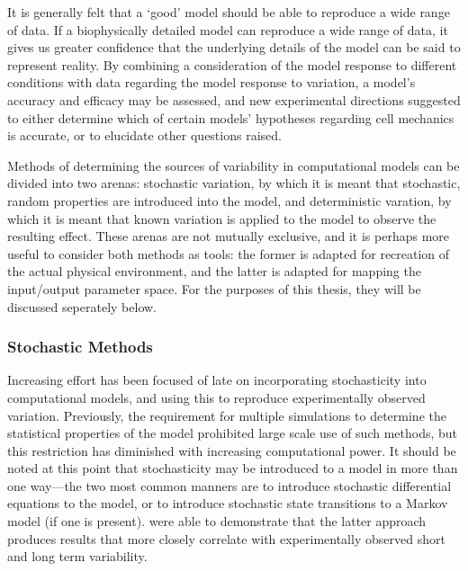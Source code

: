 \documentclass[../thesis-main.tex]{subfiles}
\begin{document}
It is generally felt that a `good' model should be able to reproduce a wide range of data. If a biophysically detailed model can reproduce a wide range of data, it gives us greater confidence that the underlying details of the model can be said to represent reality. By combining a consideration of the model response to different conditions with data regarding the model response to variation, a model's accuracy and efficacy may be assessed, and new experimental directions suggested to either determine which of certain models' hypotheses regarding cell mechanics is accurate, or to elucidate other questions raised.

Methods of determining the sources of variability in computational models can be divided into two arenas: stochastic variation, by which it is meant that stochastic, random properties are introduced into the model, and deterministic varation, by which it is meant that known variation is applied to the model to observe the resulting effect. These arenas are not mutually exclusive, and it is perhaps more useful to consider both methods as tools: the former is adapted for recreation of the actual physical environment, and the latter is adapted for mapping the input/output parameter space. For the purposes of this thesis, they will be discussed seperately below.

\subsubsection{Stochastic Methods}
\label{subsubsec:stochastic}
Increasing effort has been focused of late on incorporating stochasticity into computational models, and using this to reproduce experimentally observed variation. Previously, the requirement for multiple simulations to determine the statistical properties of the model prohibited large scale use of such methods, but this restriction has diminished with increasing computational power. It should be noted at this point that stochasticity may be introduced to a model in more than one way---the two most common manners are to introduce stochastic differential equations to the model, or to introduce stochastic state transitions to a Markov model (if one is present). \citet{Heijman2013} were able to demonstrate that the latter approach produces results that more closely correlate with experimentally observed short and long term variability.
\end{document}
